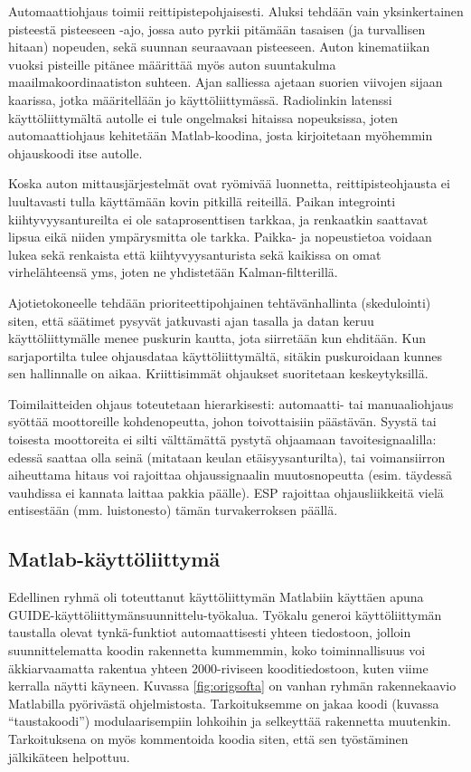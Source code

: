 \documentclass{article}
\begin{document}
Automaattiohjaus toimii reittipistepohjaisesti. Aluksi tehdään vain yksinkertainen pisteestä pisteeseen -ajo, jossa auto pyrkii pitämään tasaisen (ja turvallisen hitaan) nopeuden, sekä suunnan seuraavaan pisteeseen. Auton kinematiikan vuoksi pisteille pitänee määrittää myös auton suuntakulma maailmakoordinaatiston suhteen. Ajan salliessa ajetaan suorien viivojen sijaan kaarissa, jotka määritellään jo käyttöliittymässä. Radiolinkin latenssi käyttöliittymältä autolle ei tule ongelmaksi hitaissa nopeuksissa, joten automaattiohjaus kehitetään Matlab-koodina, josta kirjoitetaan myöhemmin ohjauskoodi itse autolle.

Koska auton mittausjärjestelmät ovat ryömivää luonnetta, reittipisteohjausta ei luultavasti tulla käyttämään kovin pitkillä reiteillä. Paikan integrointi kiihtyvyysantureilta ei ole sataprosenttisen tarkkaa, ja renkaatkin saattavat lipsua eikä niiden ympärysmitta ole tarkka. Paikka- ja nopeustietoa voidaan lukea sekä renkaista että kiihtyvyysanturista sekä kaikissa on omat virhelähteensä yms, joten ne yhdistetään Kalman-filtterillä.

Ajotietokoneelle tehdään prioriteettipohjainen tehtävänhallinta (skedulointi) siten, että säätimet pysyvät jatkuvasti ajan tasalla ja datan keruu käyttöliittymälle menee puskurin kautta, jota siirretään kun ehditään. Kun sarjaportilta tulee ohjausdataa käyttöliittymältä, sitäkin puskuroidaan kunnes sen hallinnalle on aikaa. Kriittisimmät ohjaukset suoritetaan keskeytyksillä.

Toimilaitteiden ohjaus toteutetaan hierarkisesti: automaatti- tai manuaaliohjaus syöttää moottoreille kohdenopeutta, johon toivottaisiin päästävän. Syystä tai toisesta moottoreita ei silti välttämättä pystytä ohjaamaan tavoitesignaalilla: edessä saattaa olla seinä (mitataan keulan etäisyysanturilta), tai voimansiirron aiheuttama hitaus voi rajoittaa ohjaussignaalin muutosnopeutta (esim. täydessä vauhdissa ei kannata laittaa pakkia päälle). ESP rajoittaa ohjausliikkeitä vielä entisestään (mm. luistonesto) tämän turvakerroksen päällä.

\subsection{Matlab-käyttöliittymä}

Edellinen ryhmä oli toteuttanut käyttöliittymän Matlabiin käyttäen apuna GUIDE-käyttöliittymänsuunnittelu-työkalua. Työkalu generoi käyttöliittymän taustalla olevat tynkä-funktiot automaattisesti yhteen tiedostoon, jolloin suunnittelematta koodin rakennetta kummemmin, koko toiminnallisuus voi äkkiarvaamatta rakentua yhteen 2000-riviseen kooditiedostoon, kuten viime kerralla näytti käyneen. Kuvassa \ref{fig:origsofta} on vanhan ryhmän rakennekaavio Matlabilla pyörivästä ohjelmistosta. Tarkoituksemme on jakaa koodi (kuvassa “taustakoodi”) modulaarisempiin lohkoihin ja selkeyttää rakennetta muutenkin. Tarkoituksena on myös kommentoida koodia siten, että sen työstäminen jälkikäteen helpottuu.
\end{document}
